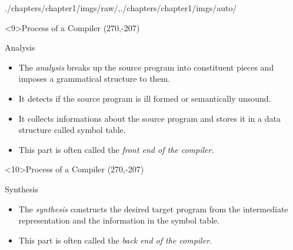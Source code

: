 \begin{graphicspathcontext}{{./chapters/chapter1/imgs/raw/},{./chapters/chapter1/imgs/auto/}}
\begin{bibunit}[apalike]
\tableofcontentslide[sectionstyle={show/shaded},subsectionstyle={hide/hide/hide},subsubsectionstyle={hide/hide/hide/hide}]

\begin{frame}<9>{Process of a Compiler}
	\putat(270,-207){}
	\begin{minipage}{.8\linewidth}
	\begin{block}{Analysis}
	\begin{itemize}
	\item The \emph{analysis} breaks up the source program into constituent pieces and imposes a grammatical structure to them.
	\item It detects if the source program is ill formed or semantically unsound.
	\item It collects informations about the source program and stores it in a data structure called symbol table.
	\item This part is often called the \emph{front end of the compiler}.
	\end{itemize}
	\end{block}
	\end{minipage}
\end{frame}

\begin{frame}<10>{Process of a Compiler}
	\putat(270,-207){}
	\begin{minipage}{.8\linewidth}
	\begin{block}{Synthesis}
	\begin{itemize}
	\item The \emph{synthesis} constructs the desired target program from the intermediate representation and the information in the symbol table.
	\item This part is often called the \emph{back end of the compiler}.
	\end{itemize}
	\end{block}
	\end{minipage}
\end{frame}


\end{bibunit}
\end{graphicspathcontext}
